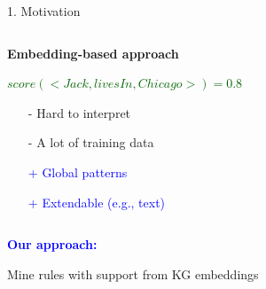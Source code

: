 \documentclass[t,final,hyperref={pdfpagelabels=true}]{beamer}
\newcommand{\bl}[1]{\textcolor{blue}{#1}}
\newcommand{\gr}[1]{\textcolor{darkgreen}{#1}}
\begin{document}
\begin{frame}
\begin{columns}[t]
\begin{column}{.5\textwidth}
\begin{block}{1. Motivation}
\begin{columns}[t]
\begin{column}{.47\textwidth}
\begin{beamerboxesrounded}[upper=uppercolbl,lower=lowercolbl,shadow=true]{\begin{center}{\smallskip\textbf{Embedding-based approach}}\end{center}}
					\begin{flushleft}
					\bigskip\medskip
					\small \gr{$score(<Jack, livesIn, Chicago>) = 0.8$}\\
					\vspace{0.3em}
					\begin{itemize}
					\item[\alert{-}] \alert{Hard to interpret}
					\item[\alert{-}] \alert{A lot of training data}
					\item[\bl{+}] \bl{Global patterns}
					\item[\bl{+}] \bl{Extendable (e.g., text)}					
					\end{itemize}
					\end{flushleft}
					\end{beamerboxesrounded}
					\end{column}				

										
				\end{columns}
								
				\medskip
				\begin{center}
				\begin{minipage}{27cm}
				\begin{beamerboxesrounded}[upper=uppercolgr,lower=lowercolgr,shadow=true]{\begin{center}{\smallskip\bl{\textbf{Our approach:}} }\end{center}}
\begin{center}Mine rules with support from KG embeddings\end{center}
				\end{beamerboxesrounded}
				\end{minipage}
				\end{center}
		

\end{block}
\end{column}
\end{columns}
\end{frame}
\end{document}
